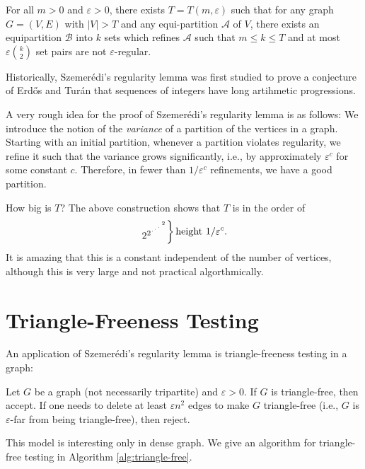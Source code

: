 \documentclass[letterpaper, reqno,11pt]{article}
\begin{document}
\begin{theorem}
  For all $m > 0$ and $\varepsilon > 0$, there exists $T = T(m, \varepsilon)$ such that for any graph $G = (V, E)$ with $|V| > T$ and any equi-partition $\mathcal A$ of $V$, there exists an equipartition $\mathcal B$ into $k$ sets which refines $\mathcal A$ such that $m \leq k \leq T$ and at most $\varepsilon \binom{k}{2}$ set pairs are not $\varepsilon$-regular.
\end{theorem}

Historically, Szemer\'edi's regularity lemma was first studied to prove a conjecture of Erd\H{o}s and Tur\'an that sequences of integers have long artihmetic progressions.

A very rough idea for the proof of Szemer\'edi's regularity lemma is as follows: We introduce the notion of the \emph{variance} of a partition of the vertices in a graph. Starting with an initial partition, whenever a partition violates regularity, we refine it such that the variance grows significantly, i.e., by approximately $\varepsilon^c$ for some constant $c$. Therefore, in fewer than $1/\varepsilon^c$ refinements, we have a good partition.

How big is $T$? The above construction shows that $T$ is in the order of
$$ \begin{rcases}
  2^{2^{\iddots^{\;2}}}
\end{rcases}\text{height $1/\varepsilon^c$}. $$
It is amazing that this is a constant independent of the number of vertices, although this is very large and not practical algorthmically.

\section{Triangle-Freeness Testing}

An application of Szemer\'edi's regularity lemma is triangle-freeness testing in a graph:

\begin{problem}
  Let $G$ be a graph (not necessarily tripartite) and $\varepsilon > 0$. If $G$ is triangle-free, then accept. If one needs to delete at least $\varepsilon n^2$ edges to make $G$ triangle-free (i.e., $G$ is $\varepsilon$-far from being triangle-free), then reject.
\end{problem}

This model is interesting only in dense graph. We give an algorithm for triangle-free testing in Algorithm \ref{alg:triangle-free}.
\end{document}
